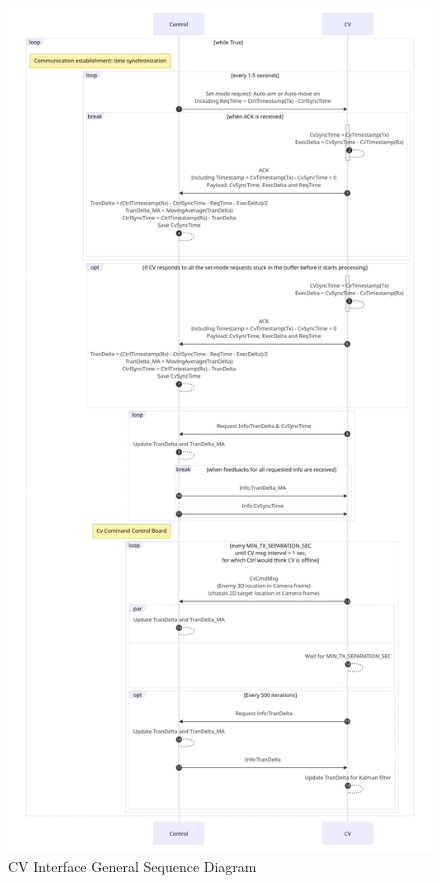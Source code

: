 \documentclass[12pt]{article}
\begin{document}
            \begin{figure}[H]
                \centering
                \includegraphics[width=\textwidth,height=\textheight,keepaspectratio]{../CV Interface General Sequence Diagram.png}
                \caption{CV Interface General Sequence Diagram}
                \label{fig:CV Interface General Sequence Diagram}
            \end{figure}
\end{document}
